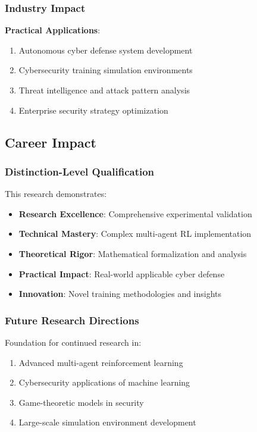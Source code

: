 \documentclass[11pt]{article}
\begin{document}
\subsubsection{Industry Impact}
\textbf{Practical Applications}:
\begin{enumerate}
\item Autonomous cyber defense system development
\item Cybersecurity training simulation environments  
\item Threat intelligence and attack pattern analysis
\item Enterprise security strategy optimization
\end{enumerate}

\subsection{Career Impact}

\subsubsection{Distinction-Level Qualification}
This research demonstrates:
\begin{itemize}
\item \textbf{Research Excellence}: Comprehensive experimental validation
\item \textbf{Technical Mastery}: Complex multi-agent RL implementation
\item \textbf{Theoretical Rigor}: Mathematical formalization and analysis
\item \textbf{Practical Impact}: Real-world applicable cyber defense
\item \textbf{Innovation}: Novel training methodologies and insights
\end{itemize}

\subsubsection{Future Research Directions}
Foundation for continued research in:
\begin{enumerate}
\item Advanced multi-agent reinforcement learning
\item Cybersecurity applications of machine learning
\item Game-theoretic models in security
\item Large-scale simulation environment development
\end{enumerate}
\end{document}
